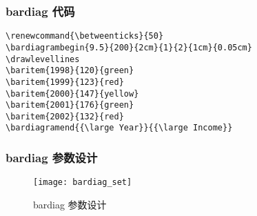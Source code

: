 \subsubsection{bardiag 代码}
\renewcommand{\betweenticks}{50}
\drawlevellines
{}

\begin{lstlisting}
\renewcommand{\betweenticks}{50}
\bardiagrambegin{9.5}{200}{2cm}{1}{2}{1cm}{0.05cm}
\drawlevellines
\baritem{1998}{120}{green}
\baritem{1999}{123}{red}
\baritem{2000}{147}{yellow}
\baritem{2001}{176}{green}
\baritem{2002}{132}{red}
\bardiagramend{{\large Year}}{{\large Income}}
\end{lstlisting}

\subsubsection{bardiag 参数设计}
\begin{figure}[H]
  \centering
  \texttt{[image: bardiag\_set]}\\
  \caption{bardiag 参数设计}\label{bardiag_set}
\end{figure}